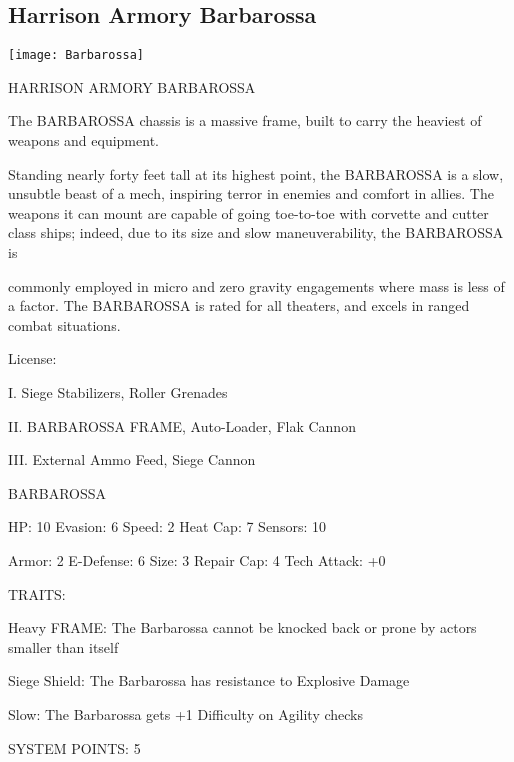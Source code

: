 \subsection{Harrison Armory Barbarossa}


\begin{center}
    \texttt{[image: Barbarossa]}
\end{center}

                           HARRISON ARMORY BARBAROSSA

The BARBAROSSA chassis is a massive frame, built to carry the heaviest of weapons and equipment.

Standing nearly forty feet tall at its highest point, the BARBAROSSA is a slow, unsubtle beast of a mech,
inspiring terror in enemies and comfort in allies. The weapons it can mount are capable of going toe-to-toe
with corvette and cutter class ships; indeed, due to its size and slow maneuverability, the BARBAROSSA is




commonly employed in micro and zero gravity engagements where mass is less of a factor. The
BARBAROSSA is rated for all theaters, and excels in ranged combat situations.

                                                  License:

I. Siege Stabilizers, Roller Grenades

II. BARBAROSSA FRAME, Auto-Loader, Flak Cannon

III. External Ammo Feed, Siege Cannon


                                            BARBAROSSA

 HP: 10         Evasion: 6                           Speed: 2           Heat Cap: 7       Sensors: 10

 Armor:  2      E-Defense: 6                         Size: 3            Repair Cap: 4     Tech Attack:
                                                                                          +0

                                                  TRAITS:

 Heavy FRAME: The Barbarossa cannot be knocked back or prone by actors smaller than itself

 Siege Shield: The Barbarossa has resistance to Explosive Damage

 Slow: The Barbarossa gets +1 Difficulty on Agility checks

                                           SYSTEM POINTS: 5

